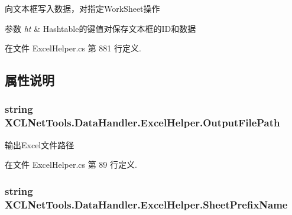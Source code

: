 向文本框写入数据，对指定\-Work\-Sheet操作 


\begin{DoxyParams}{参数}
{\em ht} & Hashtable的键值对保存文本框的\-I\-D和数据\\
\hline
\end{DoxyParams}


在文件 Excel\-Helper.\-cs 第 881 行定义.



\subsection{属性说明}
\hypertarget{class_x_c_l_net_tools_1_1_data_handler_1_1_excel_helper_ada3dfa77cf3ac278ee83281f04707aa3}{
\subsubsection[{Output\-File\-Path}]{\setlength{\rightskip}{0pt plus 5cm}string X\-C\-L\-Net\-Tools.\-Data\-Handler.\-Excel\-Helper.\-Output\-File\-Path\hspace{0.3cm}{\ttfamily [set]}}}\label{class_x_c_l_net_tools_1_1_data_handler_1_1_excel_helper_ada3dfa77cf3ac278ee83281f04707aa3}


输出\-Excel文件路径 



在文件 Excel\-Helper.\-cs 第 89 行定义.

\hypertarget{class_x_c_l_net_tools_1_1_data_handler_1_1_excel_helper_a19d5234b9309942b87041f70bef91647}{
\subsubsection[{Sheet\-Prefix\-Name}]{\setlength{\rightskip}{0pt plus 5cm}string X\-C\-L\-Net\-Tools.\-Data\-Handler.\-Excel\-Helper.\-Sheet\-Prefix\-Name\hspace{0.3cm}{\ttfamily [set]}}}\label{class_x_c_l_net_tools_1_1_data_handler_1_1_excel_helper_a19d5234b9309942b87041f70bef91647}


